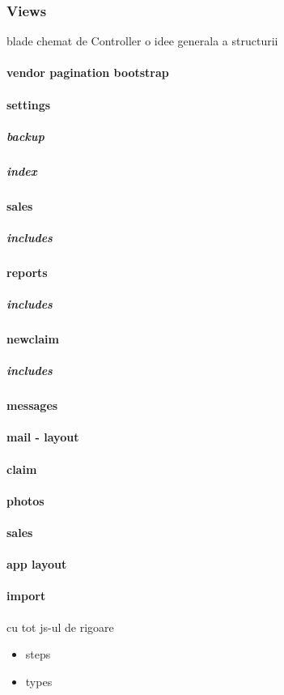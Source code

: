 \subsubsection{Views}
	blade chemat de Controller
	o idee generala a structurii
	\paragraph{vendor pagination bootstrap}
	\paragraph{settings}
		\subparagraph{backup}
		\subparagraph{index}
	\paragraph{sales}
		\subparagraph{includes}
	\paragraph{reports}
		\subparagraph{includes}
	\paragraph{newclaim}
		\subparagraph{includes}
	\paragraph{messages}
	\paragraph{mail - layout}
	\paragraph{claim}
	\paragraph{photos}
	\paragraph{sales}
	\paragraph{app layout}
	\paragraph{import}
		cu tot js-ul de rigoare
		\begin{itemize}
			\item steps
			\item types
		\end{itemize}
